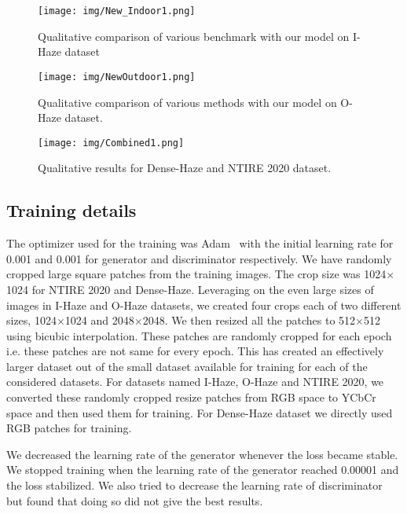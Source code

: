 \documentclass[runningheads]{llncs}
\begin{document}
\begin{figure}[t]
\centering
\texttt{[image: img/New\_Indoor1.png]}
\caption{Qualitative comparison of various benchmark with our model on I-Haze dataset}
\label{img:indoor_res}
\end{figure}
\begin{figure}[t]
\centering
\texttt{[image: img/NewOutdoor1.png]}
\caption{Qualitative comparison of various methods with our model on O-Haze dataset.}
\label{img:outdoor_res}
\end{figure}
\begin{figure}[t]
    \centering
    \texttt{[image: img/Combined1.png]}
    \caption{Qualitative results for Dense-Haze and NTIRE 2020 dataset.}
    \label{img:dense}
\end{figure}


\subsection{Training details}
The optimizer used for the training was Adam~\cite{kingma2014adam} with the initial learning rate for 0.001 and 0.001 for generator and discriminator respectively. We have randomly cropped large square patches from the training images. The crop size was 1024$\times$1024 for NTIRE 2020 and Dense-Haze. Leveraging on the even large sizes of images in I-Haze and O-Haze datasets, we created four crops each of two different sizes, 1024$\times$1024 and 2048$\times$2048. We then resized all the patches to 512$\times$512 using bicubic interpolation. These patches are randomly cropped for each epoch i.e. these patches are not same for every epoch. This has created an effectively larger dataset out of the small dataset available for training for each of the considered datasets. For datasets named I-Haze, O-Haze and NTIRE 2020, we converted these randomly cropped resize patches from RGB space to YCbCr space and then used them for training. For Dense-Haze dataset we directly used RGB patches for training. 

We decreased the learning rate of the generator whenever the loss became stable. We stopped training when the learning rate of the generator reached 0.00001 and the loss stabilized. We also tried to decrease the learning rate of discriminator but found that doing so did not give the best results. 
\end{document}
